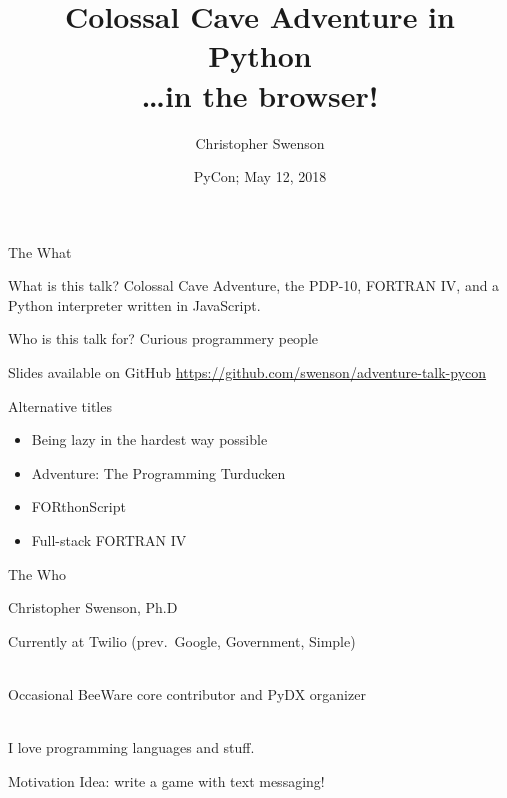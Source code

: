 \documentclass{beamer}
\title[Adventure]{Colossal Cave Adventure in Python\\ \dots in the browser!}
\author[@chris\_{}swenson]{Christopher Swenson}
\date[PyCon 2018]{PyCon; May 12, 2018}
\begin{document}
\begin{frame}
\titlepage
\end{frame}

\begin{frame}{The What}

\begin{block}{What is this talk?}
Colossal Cave Adventure, the PDP-10, FORTRAN IV, and a Python interpreter written in JavaScript.
\end{block}

\begin{block}{Who is this talk for?}
Curious programmery people
\end{block}

\begin{block}{Slides available on GitHub}
\url{https://github.com/swenson/adventure-talk-pycon}
\end{block}

\end{frame}

\begin{frame}{Alternative titles}

\begin{itemize}
  \item Being lazy in the hardest way possible
  \item Adventure: The Programming Turducken
  \item FORthonScript
  \item Full-stack FORTRAN IV
\end{itemize}

\end{frame}

\begin{frame}{The Who}

\begin{block}{Christopher Swenson, Ph.D}

Currently at Twilio (prev.\ Google, Government, Simple)

\ \\

Occasional BeeWare core contributor and PyDX organizer

\ \\

I love programming languages and stuff.

\end{block}

\end{frame}

\begin{frame}{Motivation}
Idea: write a game with text messaging!

\ \\


\end{frame}
\end{document}
